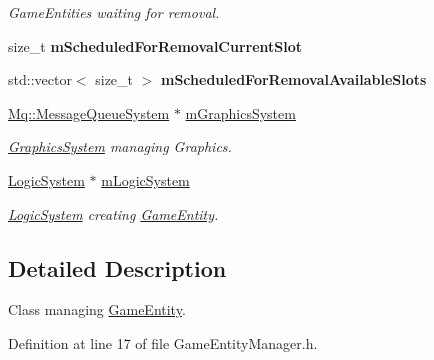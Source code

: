 \begin{DoxyCompactItemize}
\begin{DoxyCompactList}\small\item\em Game\+Entities waiting for removal. \end{DoxyCompactList}\item 
\mbox{\label{class_common_1_1_game_entity_manager_a13e1ddfcd9e269ab11836e5f0333dcbb}} 
size\+\_\+t {\bfseries m\+Scheduled\+For\+Removal\+Current\+Slot}
\item 
\mbox{\label{class_common_1_1_game_entity_manager_a8e28087a746ac5b44b7c7200226c85f7}} 
std\+::vector$<$ size\+\_\+t $>$ {\bfseries m\+Scheduled\+For\+Removal\+Available\+Slots}
\item 
\mbox{\label{class_common_1_1_game_entity_manager_aacead10c62bd45635679ca8161201794}} 
\hyperlink{class_common_1_1_mq_1_1_message_queue_system}{Mq\+::\+Message\+Queue\+System} $\ast$ \hyperlink{class_common_1_1_game_entity_manager_aacead10c62bd45635679ca8161201794}{m\+Graphics\+System}
\begin{DoxyCompactList}\small\item\em \hyperlink{class_common_1_1_graphics_system}{Graphics\+System} managing Graphics. \end{DoxyCompactList}\item 
\mbox{\label{class_common_1_1_game_entity_manager_a9ea718e158804544184545fe7ae5dc6b}} 
\hyperlink{class_common_1_1_logic_system}{Logic\+System} $\ast$ \hyperlink{class_common_1_1_game_entity_manager_a9ea718e158804544184545fe7ae5dc6b}{m\+Logic\+System}
\begin{DoxyCompactList}\small\item\em \hyperlink{class_common_1_1_logic_system}{Logic\+System} creating \hyperlink{struct_common_1_1_game_entity}{Game\+Entity}. \end{DoxyCompactList}\end{DoxyCompactItemize}


\subsection{Detailed Description}
Class managing \hyperlink{struct_common_1_1_game_entity}{Game\+Entity}. 

Definition at line 17 of file Game\+Entity\+Manager.\+h.



